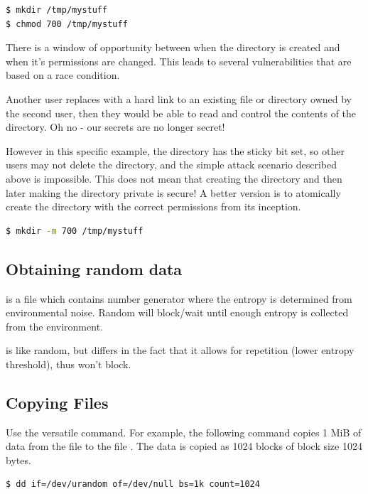 \begin{verbatim}
$ mkdir /tmp/mystuff
$ chmod 700 /tmp/mystuff
\end{verbatim}

There is a window of opportunity between when the directory is created and when it's permissions are changed.
This leads to several vulnerabilities that are based on a race condition.

Another user replaces  with a hard link to an existing file or directory owned by the second user, then they would be able to read and control the contents of the  directory.
Oh no - our secrets are no longer secret!

However in this specific example, the  directory has the sticky bit set, so other users may not delete the  directory, and the simple attack scenario described above is impossible.
This does not mean that creating the directory and then later making the directory private is secure!
A better version is to atomically create the directory with the correct permissions from its inception.

\begin{lstlisting}[language=bash]
$ mkdir -m 700 /tmp/mystuff
\end{lstlisting}

\subsection{Obtaining random data}

 is a file which contains number generator where the entropy is determined from environmental noise.
Random will block/wait until enough entropy is collected from the environment.

 is like random, but differs in the fact that it allows for repetition (lower entropy threshold), thus won't block.


\subsection{Copying Files}

Use the versatile  command.
For example, the following command copies 1 MiB of data from the file  to the file .
The data is copied as 1024 blocks of block size 1024 bytes.

\begin{verbatim}
$ dd if=/dev/urandom of=/dev/null bs=1k count=1024
\end{verbatim}

